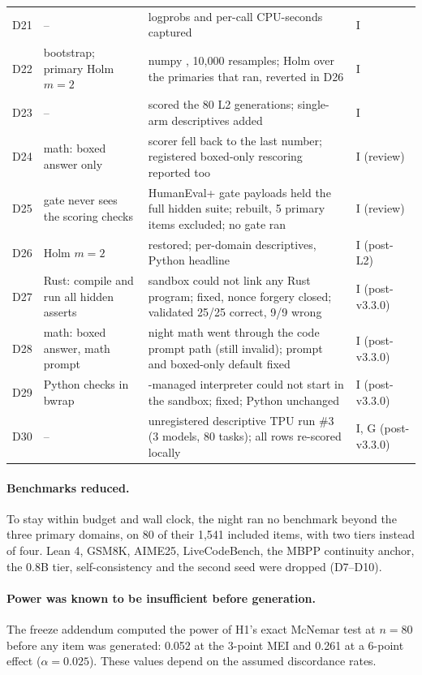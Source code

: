 \documentclass[11pt,a4paper]{article}
\newcommand{\code}[1]{\texttt{\detokenize{#1}}}
\begin{document}
\begin{table}[!htbp]
\begin{tabular}{l p{4.6cm} p{6.0cm} p{2.2cm}}
D21 & -- & logprobs and per-call CPU-seconds captured & I\\
D22 & \code{random.Random(0)} bootstrap; primary Holm $m=2$ & numpy \code{default_rng(0)}, 10,000 resamples; Holm over the primaries that ran, reverted in D26 & I\\
D23 & -- & scored the 80 L2 generations; single-arm descriptives added & I\\
D24 & math: boxed answer only & scorer fell back to the last number; registered boxed-only rescoring reported too & I (review)\\
D25 & gate never sees the scoring checks & HumanEval+ gate payloads held the full hidden suite; rebuilt, 5 primary items excluded; no gate ran & I (review)\\
D26 & Holm $m=2$ & restored; per-domain descriptives, Python headline & I (post-L2)\\
D27 & Rust: compile and run all hidden asserts & sandbox could not link any Rust program; fixed, nonce forgery closed; validated 25/25 correct, 9/9 wrong & I (post-v3.3.0)\\
D28 & math: boxed answer, math prompt & night math went through the code prompt path (still invalid); prompt and boxed-only default fixed & I (post-v3.3.0)\\
D29 & Python checks in bwrap & \code{uv}-managed interpreter could not start in the sandbox; fixed; Python unchanged & I (post-v3.3.0)\\
D30 & -- & unregistered descriptive TPU run \#3 (3 models, 80 tasks); all rows re-scored locally & I, G (post-v3.3.0)\\
\bottomrule\end{tabular}\end{table}

\paragraph{Benchmarks reduced.} To stay within budget and wall clock, the night ran no benchmark
beyond the three primary domains, on 80 of their 1,541 included items, with two tiers instead of
four. Lean 4, GSM8K, AIME25, LiveCodeBench, the MBPP continuity anchor, the 0.8B tier,
self-consistency and the second seed were dropped (D7--D10).

\paragraph{Power was known to be insufficient before generation.} The freeze addendum computed the
power of H1's exact McNemar test at $n=80$ before any item was generated: 0.052 at the 3-point MEI
and 0.261 at a 6-point effect ($\alpha=0.025$). These values depend on the assumed discordance
rates.
\end{document}
